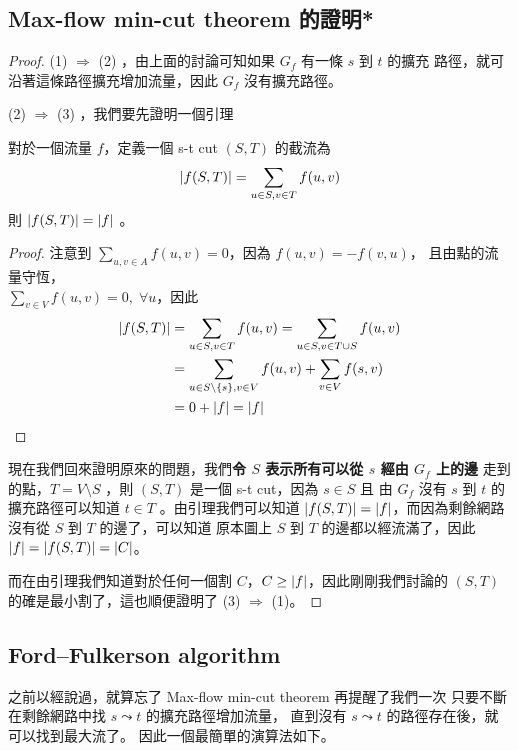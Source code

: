 \documentclass[a4paper,12pt]{book}
\begin{document}
\subsection{Max-flow min-cut theorem 的證明*}
\begin{proof}
  (1) $\Rightarrow$ (2) ，由上面的討論可知如果 $G_f$ 有一條 $s$ 到 $t$ 的擴充
  路徑，就可沿著這條路徑擴充增加流量，因此 $G_f$ 沒有擴充路徑。 
  
  (2) $\Rightarrow$ (3) ，我們要先證明一個引理
\begin{lemma}
  對於一個流量 $f$，定義一個 s-t cut $(S, T)$ 的截流為
  \[ \lvert f(S, T) \rvert = \sum_{u \in S, v \in T} f(u, v) \]
  則 $\lvert f(S, T) \rvert = \lvert f \rvert$ 。
\end{lemma}
\begin{proof}
  注意到 $\sum\limits_{u, v \in A} f(u, v) = 0$，因為 $f(u, v) = -f(v, u)$，
  且由點的流量守恆，\\$\sum\limits_{v \in V} f(u, v) = 0, \; \forall u$，因此
  \vspace*{-.5cm}\begin{align*}
    \lvert f(S, T) \rvert &= \sum_{u \in S, v \in T} f(u, v) 
    = \sum_{u \in S, v \in T \cup S} f(u, v) \\
    &= \sum_{u \in S \setminus \{s\}, v \in V} f(u, v)
     + \sum_{v \in V} f(s, v) \\
     &= 0 + \lvert f \rvert = \lvert f \rvert 
  \end{align*} 
\end{proof}
現在我們回來證明原來的問題，我們{\bf 令 $S$ 表示所有可以從 $s$ 經由 $G_f$ 上的邊}%
走到的點，$T = V \setminus S$ ，則 $(S, T)$ 是一個 s-t cut，因為 $s \in S$ 且
由 $G_f$ 沒有 $s$ 到 $t$ 的擴充路徑可以知道 $t \in T$ 。由引理我們可以知道
$\lvert f(S, T) \rvert = \lvert f \rvert$，而因為剩餘網路沒有從 $S$ 到 $T$ 的邊了，可以知道
原本圖上 $S$ 到 $T$ 的邊都以經流滿了，因此 $\lvert f \rvert = \lvert f(S, T) \rvert = \lvert C \rvert$。

而在由引理我們知道對於任何一個割 $C$，$C \geq \lvert f \rvert$，因此剛剛我們討論的
$(S, T)$的確是最小割了，這也順便證明了 (3) $\Rightarrow$ (1)。
\end{proof}


\subsection{Ford–Fulkerson algorithm}
之前以經說過，就算忘了 Max-flow min-cut theorem 再提醒了我們一次
只要不斷在剩餘網路中找 $s \leadsto t$ 的擴充路徑增加流量，
直到沒有 $s \leadsto t$ 的路徑存在後，就可以找到最大流了。
因此一個最簡單的演算法如下。
\end{document}
